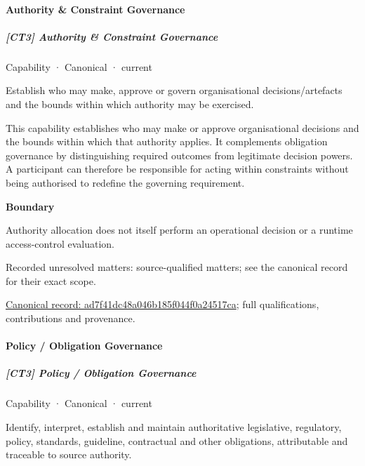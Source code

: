 \paragraph{Authority \& Constraint Governance}

\subparagraph{[CT3] Authority \& Constraint Governance}

\label{element:ad7f41dc48a046b185f044f0a24517ca}
{\small Capability · Canonical · current}\par

Establish who may make, approve or govern organisational decisions/artefacts and the bounds within which authority may be exercised.



This capability establishes who may make or approve organisational decisions and the bounds within which that authority applies. It complements obligation governance by distinguishing required outcomes from legitimate decision powers. A participant can therefore be responsible for acting within constraints without being authorised to redefine the governing requirement.



\textbf{Boundary}



Authority allocation does not itself perform an operational decision or a runtime access-control evaluation.


{\small Recorded unresolved matters: source-qualified matters; see the canonical record for their exact scope.}\par
{\footnotesize \href{../../../../continuum/strategy/capability/ad7f41dc48a046b185f044f0a24517ca.md}{Canonical record: ad7f41dc48a046b185f044f0a24517ca}; full qualifications, contributions and provenance.}\par
\paragraph{Policy / Obligation Governance}

\subparagraph{[CT3] Policy / Obligation Governance}

\label{element:73c6e5b36bdf4bf0ad2b8b50c9b9a00b}
{\small Capability · Canonical · current}\par

Identify, interpret, establish and maintain authoritative legislative, regulatory, policy, standards, guideline, contractual and other obligations, attributable and traceable to source authority.



